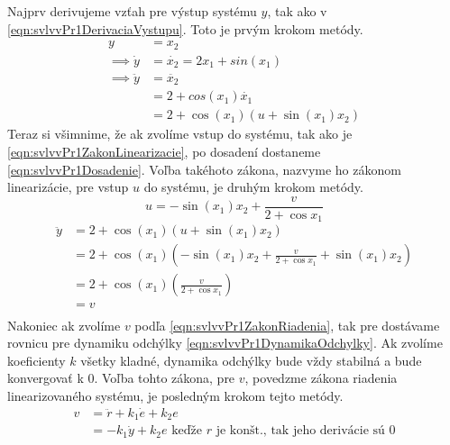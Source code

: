 \documentclass[../main.tex]{subfiles}
\begin{document}
	Najprv derivujeme vzťah pre výstup systému $y$, tak ako v \cref{eqn:svlvvPr1DerivaciaVystupu}. Toto je prvým krokom metódy.
	\begin{equation}
	\begin{aligned}
		y &= x_2 \\ 
		\implies \dot{y}  &= \dot{x_2} =  2x_1 + sin(x_1) \\
		\implies \ddot{y} &= \ddot{x_2} \\
						  &= 2 + cos(x_1)\dot{x_1} \\
						  &= 2 + \cos(x_1)(u + \sin(x_1) x_2)
		\end{aligned}
		\label{eqn:svlvvPr1DerivaciaVystupu}
	\end{equation}
	Teraz si všimnime, že ak zvolíme vstup do systému, tak ako je \cref{eqn:svlvvPr1ZakonLinearizacie}, po dosadení dostaneme \cref{eqn:svlvvPr1Dosadenie}. Voľba takéhoto zákona, nazvyme ho zákonom linearizácie, pre vstup $u$ do systému, je druhým krokom metódy.
	\begin{equation}
	 u = -\sin(x_1) x_2  +  \frac{v}{2 + \cos x_1}
	 \label{eqn:svlvvPr1ZakonLinearizacie}
	\end{equation}
	\begin{equation}
	\begin{aligned}
	 	\ddot{y} &= 2 + \cos(x_1)(u + \sin(x_1) x_2) \\
	 		     &= 2 + \cos(x_1)(-\sin(x_1) x_2  +  \frac{v}{2 + \cos x_1} + \sin(x_1) x_2)  \\ 
	 		     &= 2 + \cos(x_1)(\frac{v}{2 + \cos x_1})  \\ 
	 		     &= v  \\ 
 	\end{aligned}
	\label{eqn:svlvvPr1Dosadenie}
	\end{equation}
	Nakoniec ak zvolíme $v$ podľa \cref{eqn:svlvvPr1ZakonRiadenia}, tak pre dostávame rovnicu pre dynamiku odchýlky \cref{eqn:svlvvPr1DynamikaOdchylky}. Ak zvolíme koeficienty $k$ všetky kladné, dynamika odchýlky bude vždy stabilná a bude konvergovať k 0. Voľba tohto zákona, pre $v$, povedzme zákona riadenia linearizovaného systému, je posledným krokom tejto metódy.
	\begin{equation}
	\begin{aligned}
	 v &= \ddot{r}  +k_1 \dot{e} + k_2 e \\
	   &= -k_1 \dot{y} + k_2 e \text{ keďže $r$ je konšt., tak jeho derivácie sú 0}\\
	   \end{aligned}
	\label{eqn:svlvvPr1ZakonRiadenia}
	\end{equation}
\end{document}
